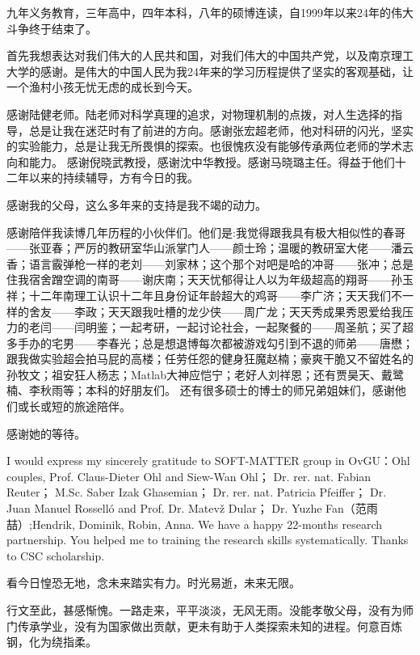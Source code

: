 \begin{thanks}


九年义务教育，三年高中，四年本科，八年的硕博连读，自1999年以来24年的伟大斗争终于结束了。

首先我想表达对我们伟大的人民共和国，对我们伟大的中国共产党，以及南京理工大学的感谢。是伟大的中国人民为我24年来的学习历程提供了坚实的客观基础，让一个渔村小孩无忧无虑的成长到今天。

感谢陆健老师。陆老师对科学真理的追求，对物理机制的点拨，对人生选择的指导，总是让我在迷茫时有了前进的方向。感谢张宏超老师，他对科研的闪光，坚实的实验能力，总是让我无所畏惧的探索。也很愧疚没有能够传承两位老师的学术志向和能力。
感谢倪晓武教授，感谢沈中华教授。感谢马晓璐主任。得益于他们十二年以来的持续辅导，方有今日的我。

感谢我的父母，这么多年来的支持是我不竭的动力。

感谢陪伴我读博几年历程的小伙伴们。他们是:我觉得跟我具有极大相似性的春哥——张亚春；严厉的教研室华山派掌门人——颜士玲；温暖的教研室大佬——潘云香；语言霰弹枪一样的老刘——刘家林；这个那个对吧是哈的冲哥——张冲；总是住我宿舍蹭空调的南哥——谢庆南；天天忧郁得让人以为年级超高的翔哥——孙玉祥；十二年南理工认识十二年且身份证年龄超大的鸡哥——李广济；天天我们不一样的舍友——李政；天天跟我吐槽的龙少侠——周广龙；天天秀成果秀恩爱给我压力的老闫——闫明鉴；一起考研，一起讨论社会，一起聚餐的——周圣航；买了超多手办的宅男——李春光；总是想退博每次都被游戏勾引到不退的师弟——唐懋；跟我做实验超会拍马屁的高楼；任劳任怨的健身狂魔赵楠；豪爽干脆又不留姓名的孙牧文；祖安狂人杨志；Matlab大神应恺宁；老好人刘祥恩；还有贾昊天、戴鹭楠、李秋雨等；本科的好朋友们。
还有很多硕士的博士的师兄弟姐妹们，感谢他们或长或短的旅途陪伴。

感谢她的等待。

I would express my sincerely gratitude to SOFT-MATTER group in OvGU：Ohl couples, Prof. Claus-Dieter Ohl and Siew-Wan Ohl； Dr. rer. nat. Fabian Reuter； M.Sc. Saber Izak Ghasemian； Dr. rer. nat. Patricia Pfeiffer； Dr. Juan Manuel Rosselló and Prof. Dr. Matevž Dular； Dr. Yuzhe Fan（范雨{喆}）;Hendrik, Dominik, Robin, Anna. We have a happy 22-months research partnership. You helped me to training the research skills systematically. Thanks to CSC scholarship.

看今日惶恐无地，念未来踏实有力。时光易逝，未来无限。

行文至此，甚感惭愧。一路走来，平平淡淡，无风无雨。没能孝敬父母，没有为师门传承学业，没有为国家做出贡献，更未有助于人类探索未知的进程。何意百炼钢，化为绕指柔。


\end{thanks}
